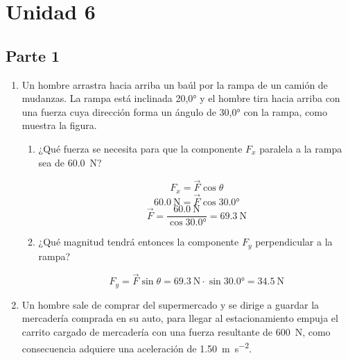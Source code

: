 \documentclass[../practica.root.tex]{subfiles}
\begin{document}
\newcommand{\gravity}[1][per-mode=fraction]{\SI[#1]{9,8}{\meter\per\second\squared}}

\section{Unidad 6}
\subsection{Parte 1}
\begin{enumerate}
	\item Un hombre arrastra hacia arriba un baúl por la rampa de un camión de mudanzas. La rampa está inclinada \ang{20,0} y el hombre tira hacia arriba con una fuerza cuya dirección forma un ángulo de \ang{30,0} con la rampa, como muestra la figura.

	      \begin{center}
	      \end{center}

	      \begin{enumerate}
		      \item ¿Qué fuerza se necesita para que la componente $F_x$ paralela a la rampa sea de \SI{60,0}{\newton}?

		            \[F_x=\vec{F}\cos{\theta}\]
		            \[\SI{60,0}{\newton}=\vec{F}\cos{\ang{30,0}}\]
		            \[\vec{F}=\frac{\SI{60,0}{\newton}}{\cos{\ang{30,0}}}=\boxed{\SI{69,3}{\newton}}\]

		      \item ¿Qué magnitud tendrá entonces la componente $F_y$ perpendicular a la rampa?

		            \[F_y=\vec{F}\sin{\theta}=\SI{69,3}{\newton}\cdot\sin{\ang{30,0}}=\boxed{\SI{34,5}{\newton}}\]
	      \end{enumerate}

	\item Un hombre sale de comprar del supermercado y se dirige a guardar la mercadería comprada en su auto, para llegar al estacionamiento empuja el carrito cargado de mercadería con una fuerza resultante de \SI{600}{\newton}, como consecuencia adquiere una aceleración de \SI{1,50}{\meter\per\second\squared}.


\end{enumerate}
\end{document}
